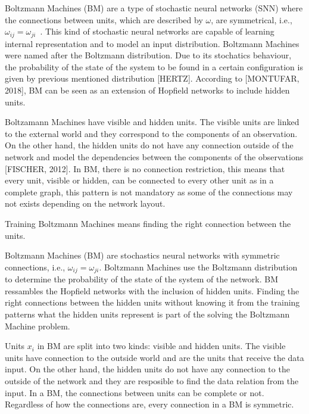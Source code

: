 Boltzmann Machines (BM) are a type of stochastic neural networks (SNN) where the connections between units, which are described by $\omega$, are symmetrical, i.e., $\omega_{ij} = \omega_{ji}$~\cite{bib:hertz1991}.
This kind of stochastic neural networks are capable of learning internal representation and to model an input distribution.
Boltzmann Machines were named after the Boltzmann distribution.
Due to its stochatics behaviour, the probability of the state of the system to be found in a certain configuration is given by previous mentioned distribution [HERTZ].
According to [MONTUFAR, 2018], BM can be seen as an extension of Hopfield networks to include hidden units.

Boltzamann Machines have visible and hidden units.
The visible units are linked to the external world and they correspond to the components of an observation. On the other hand, the hidden units do not have any connection outside of the network and model the dependencies between the components of the observations [FISCHER, 2012].
In BM, there is no connection restriction, this means that every unit, visible or hidden, can be connected to every other unit as in a complete graph, this pattern is not mandatory as some of the connections may not exists depending on the network layout.


Training Boltzmann Machines means finding the right connection between the units.

Boltzmann Machines (BM) are stochastics neural networks with symmetric connections, i.e., $\omega_{ij} = \omega_{ji}$.
Boltzmann Machines use the Boltzmann distribution to determine the probability of the state of the system of the network.
BM ressambles the Hopfield networks with the inclusion of hidden units.
Finding the right connections between the hidden units without knowing it from the training patterns what the hidden units represent is part of the solving the Boltzmann Machine problem.

Units $x_{i}$ in BM are split into two kinds: visible and hidden units.
The visible units have connection to the outside world and are the units that receive the data input.
On the other hand, the hidden units do not have any connection to the outside of the network and they are resposible to find the data relation from the input.
In a BM, the connections between units can be complete or not.
Regardless of how the connections are, every connection in a BM is symmetric.

